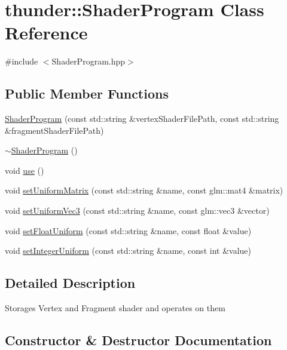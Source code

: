\hypertarget{classthunder_1_1_shader_program}{}\section{thunder\+:\+:Shader\+Program Class Reference}
\label{classthunder_1_1_shader_program}


{\ttfamily \#include $<$Shader\+Program.\+hpp$>$}

\subsection*{Public Member Functions}
\begin{DoxyCompactItemize}
\item 
\mbox{\hyperlink{classthunder_1_1_shader_program_a80f307830ba7782043ed35b0921d115c}{Shader\+Program}} (const std\+::string \&vertex\+Shader\+File\+Path, const std\+::string \&fragment\+Shader\+File\+Path)
\item 
\mbox{\hyperlink{classthunder_1_1_shader_program_abf3826a146b63b5fcb8214de236732ac}{$\sim$\+Shader\+Program}} ()
\item 
void \mbox{\hyperlink{classthunder_1_1_shader_program_a1ef3d2a9d475859d53b60d8999c02068}{use}} ()
\item 
void \mbox{\hyperlink{classthunder_1_1_shader_program_a4a16ff2da021f298a4f00957e987682c}{set\+Uniform\+Matrix}} (const std\+::string \&name, const glm\+::mat4 \&matrix)
\item 
void \mbox{\hyperlink{classthunder_1_1_shader_program_a88bff19b426a37bb610434be19e07d12}{set\+Uniform\+Vec3}} (const std\+::string \&name, const glm\+::vec3 \&vector)
\item 
void \mbox{\hyperlink{classthunder_1_1_shader_program_a10a375f97b7774beac6280db50318811}{set\+Float\+Uniform}} (const std\+::string \&name, const float \&value)
\item 
void \mbox{\hyperlink{classthunder_1_1_shader_program_aa763d389b3670b9c17276ce144729d16}{set\+Integer\+Uniform}} (const std\+::string \&name, const int \&value)
\end{DoxyCompactItemize}


\subsection{Detailed Description}
Storages Vertex and Fragment shader and operates on them 

\subsection{Constructor \& Destructor Documentation}
\mbox{\label{classthunder_1_1_shader_program_a80f307830ba7782043ed35b0921d115c}} 

